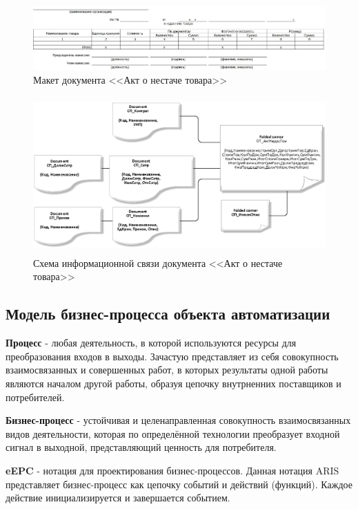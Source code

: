 \begin{figure}[!h]
    \centering
    \includegraphics[width=14cm]
        {_docs/ОТ_АктНедосТов_макет.jpg}
    \caption{Макет документа <<Акт о нестаче товара>>}
    \label{fig:OT_AktNedosTov_maket}
\end{figure}

\begin{figure}[!h]
    \centering
    \includegraphics[height=6cm]
        {_docs/ОТ_АктНедосТов_связи.png}
    \caption{Схема информационной связи документа <<Акт о нестаче товара>>}
    \label{fig:OP_AktNedosTov_svazi}
\end{figure}

\newpage
\subsection{Модель бизнес-процесса объекта автоматизации}

\textbf{Процесс} - любая деятельность, в которой используются ресурсы для преобразования входов в выходы.
Зачастую представляет из себя совокупность взаимосвязанных и совершенных работ,
в которых результаты одной работы являются началом другой работы,
образуя цепочку внутрненних поставщиков и потребителей.

\textbf{Бизнес-процесс} - устойчивая и целенаправленная совокупность взаимосвязанных видов деятельности,
которая по определённой технологии преобразует входной сигнал в выходной, представляющий ценность для потребителя.

\textbf{eEPC} - нотация для проектирования бизнес-процессов.
Данная нотация ARIS представляет бизнес-процесс как цепочку событий и действий (функций).
Каждое действие инициализируется и завершается событием.

